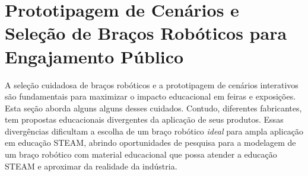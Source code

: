 \documentclass[%
  12pt,%
  a4paper,%
  oneside,%
  openright,%
  sumario = abnt-6027-2012,%
  chapter = TITLE,%
  pretextualoneside,%
  fontetimes,%
  semrecuonosumario,%
  usemakeindex,%
  pardeassinaturas,%
  english,%
  french,%
  spanish,%
  brazil,%
]{utfpr}%
\begin{document}
\chapter{Prototipagem de Cenários e Seleção de Braços Robóticos para Engajamento Público}
A seleção cuidadosa de braços robóticos e a prototipagem de cenários interativos são fundamentais para maximizar o impacto educacional em feiras e exposições. Esta seção aborda alguns alguns desses cuidados. Contudo, diferentes fabricantes, tem propostas educacionais divergentes da aplicação de seus produtos. Essas divergências dificultam a escolha de um braço robótico \emph{ideal} para ampla aplicação em educação STEAM, abrindo oportunidades de pesquisa para a modelagem de um braço robótico com material educacional que possa atender a educação STEAM e aproximar da realidade da indústria.
\end{document}
